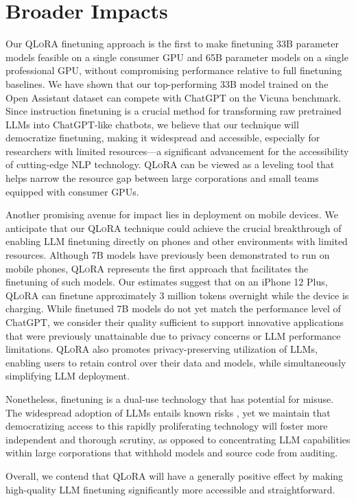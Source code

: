 \section{Broader Impacts}

Our \textsc{QLoRA} finetuning approach is the first to make finetuning 33B parameter models feasible on a single consumer GPU and 65B parameter models on a single professional GPU, without compromising performance relative to full finetuning baselines. We have shown that our top-performing 33B model trained on the Open Assistant dataset can compete with ChatGPT on the Vicuna benchmark. Since instruction finetuning is a crucial method for transforming raw pretrained LLMs into ChatGPT-like chatbots, we believe that our technique will democratize finetuning, making it widespread and accessible, especially for researchers with limited resources—a significant advancement for the accessibility of cutting-edge NLP technology. \textsc{QLoRA} can be viewed as a leveling tool that helps narrow the resource gap between large corporations and small teams equipped with consumer GPUs.

Another promising avenue for impact lies in deployment on mobile devices. We anticipate that our \textsc{QLoRA} technique could achieve the crucial breakthrough of enabling LLM finetuning directly on phones and other environments with limited resources. Although 7B models have previously been demonstrated to run on mobile phones, \textsc{QLoRA} represents the first approach that facilitates the finetuning of such models. Our estimates suggest that on an iPhone 12 Plus, \textsc{QLoRA} can finetune approximately 3 million tokens overnight while the device is charging. While finetuned 7B models do not yet match the performance level of ChatGPT, we consider their quality sufficient to support innovative applications that were previously unattainable due to privacy concerns or LLM performance limitations. \textsc{QLoRA} also promotes privacy-preserving utilization of LLMs, enabling users to retain control over their data and models, while simultaneously simplifying LLM deployment.

Nonetheless, finetuning is a dual-use technology that has potential for misuse. The widespread adoption of LLMs entails known risks \citep{bommasani2021opportunities,bender2021dangers}, yet we maintain that democratizing access to this rapidly proliferating technology will foster more independent and thorough scrutiny, as opposed to concentrating LLM capabilities within large corporations that withhold models and source code from auditing.

Overall, we contend that \textsc{QLoRA} will have a generally positive effect by making high-quality LLM finetuning significantly more accessible and straightforward. 

